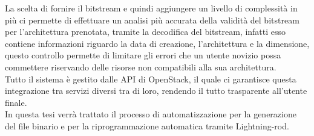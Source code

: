 La scelta di fornire il bitstream e quindi aggiungere un livello di complessità in più ci permette di effettuare un analisi più accurata della validità del bitstream per l'architettura prenotata, tramite la decodifica del bitstream, infatti esso contiene informazioni riguardo la data di creazione, l'architettura e la dimensione, questo controllo permette di limitare gli errori che un utente novizio possa commettere riservando delle risorse non compatibili alla sua architettura.\\
Tutto il sistema è gestito dalle API di OpenStack, il quale ci garantisce questa integrazione tra servizi diversi tra di loro, rendendo il tutto trasparente all'utente finale.\\
In questa tesi verrà trattato il processo di automatizzazione per la generazione del file binario e per la riprogrammazione automatica tramite Lightning-rod.
 


